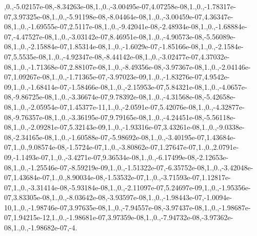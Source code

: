 {,0.,-\/5.\-02157e-\/08,-\/8.\-34263e-\/08,1.,0.,-\/3.\-00495e-\/07,4.\-07258e-\/08,1.,0.,-\/1.\-78317e-\/07,3.\-97325e-\/08,1.,0.,-\/5.\-91198e-\/08,-\/8.\-04464e-\/08,1.,0.,-\/3.\-00459e-\/07,4.\-36347e-\/08,1.,0.,-\/1.\-69555e-\/07,2.\-5117e-\/08,1.,0.,-\/9.\-42041e-\/08,-\/2.\-48934e-\/08,1.,0.,-\/1.\-68884e-\/07,-\/4.\-47527e-\/08,1.,0.,-\/3.\-03142e-\/07,8.\-46951e-\/08,1.,0.,-\/4.\-90573e-\/08,-\/5.\-56089e-\/08,1.,0.,-\/2.\-15884e-\/07,1.\-85314e-\/08,1.,0.,-\/1.\-6029e-\/07,-\/1.\-85166e-\/08,1.,0.,-\/2.\-1584e-\/07,5.\-5535e-\/08,1.,0.,-\/4.\-92347e-\/08,-\/8.\-44142e-\/08,1.,0.,-\/3.\-02477e-\/07,4.\-37032e-\/08,1.,0.,-\/1.\-71368e-\/07,2.\-88107e-\/08,1.,0.,-\/8.\-49356e-\/08,-\/3.\-97367e-\/08,1.,0.,-\/2.\-04146e-\/07,1.\-09267e-\/08,1.,0.,-\/1.\-71365e-\/07,-\/3.\-97023e-\/09,1.,0.,-\/1.\-83276e-\/07,4.\-9542e-\/09,1.,0.,-\/1.\-68414e-\/07,-\/1.\-58466e-\/08,1.,0.,-\/2.\-15953e-\/07,5.\-84321e-\/08,1.,0.,-\/4.\-0657e-\/08,-\/9.\-86725e-\/08,1.,0.,-\/3.\-36674e-\/07,9.\-78392e-\/08,1.,0.,-\/4.\-31568e-\/08,-\/5.\-42658e-\/08,1.,0.,-\/2.\-05954e-\/07,1.\-45377e-\/11,1.,0.,-\/2.\-0591e-\/07,5.\-42076e-\/08,1.,0.,-\/4.\-32877e-\/08,-\/9.\-76357e-\/08,1.,0.,-\/3.\-36195e-\/07,9.\-79165e-\/08,1.,0.,-\/4.\-24451e-\/08,-\/5.\-56118e-\/08,1.,0.,-\/2.\-09281e-\/07,5.\-32143e-\/09,1.,0.,-\/1.\-93316e-\/07,3.\-43261e-\/08,1.,0.,-\/9.\-0338e-\/08,-\/2.\-34165e-\/08,1.,0.,-\/1.\-60588e-\/07,-\/5.\-98692e-\/08,1.,0.,-\/3.\-40195e-\/07,1.\-43684e-\/07,1.,0.,9.\-08574e-\/08,-\/1.\-5724e-\/07,1.,0.,-\/3.\-80862e-\/07,1.\-27647e-\/07,1.,0.,2.\-0791e-\/09,-\/1.\-1493e-\/07,1.,0.,-\/3.\-4271e-\/07,9.\-36534e-\/08,1.,0.,-\/6.\-17499e-\/08,-\/2.\-12653e-\/08,1.,0.,-\/1.\-25546e-\/07,-\/8.\-59219e-\/09,1.,0.,-\/1.\-51322e-\/07,-\/6.\-35752e-\/08,1.,0.,-\/3.\-42048e-\/07,1.\-43684e-\/07,1.,0.,8.\-90034e-\/08,-\/1.\-53532e-\/07,1.,0.,-\/3.\-71593e-\/07,1.\-12817e-\/07,1.,0.,-\/3.\-31414e-\/08,-\/5.\-93184e-\/08,1.,0.,-\/2.\-11097e-\/07,5.\-24697e-\/09,1.,0.,-\/1.\-95356e-\/07,3.\-83305e-\/08,1.,0.,-\/8.\-03642e-\/08,-\/3.\-93597e-\/08,1.,0.,-\/1.\-98443e-\/07,-\/1.\-0094e-\/10,1.,0.,-\/1.\-98746e-\/07,3.\-97635e-\/08,1.,0.,-\/7.\-94557e-\/08,-\/3.\-97437e-\/08,1.,0.,-\/1.\-98687e-\/07,1.\-94215e-\/12,1.,0.,-\/1.\-98681e-\/07,3.\-97359e-\/08,1.,0.,-\/7.\-94732e-\/08,-\/3.\-97362e-\/08,1.,0.,-\/1.\-98682e-\/07,-\/4.}
